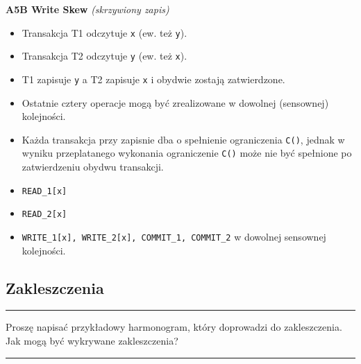 \documentclass[a5paper,6pt]{article}
\newcommand{\horrule}[1]{\rule{\linewidth}{#1}}
\begin{document}
    \textbf{A5B Write Skew} \textit{(skrzywiony zapis)}
    \begin{itemize}
        \item Transakcja T1 odczytuje \texttt{x} (ew. też \texttt{y}).
        \item Transakcja T2 odczytuje \texttt{y} (ew. też \texttt{x}).
        \item T1 zapisuje \texttt{y} a T2 zapisuje \texttt{x} i obydwie
              zostają zatwierdzone.
        \item Ostatnie cztery operacje mogą być zrealizowane w dowolnej
              (sensownej) kolejności.
        \item Każda transakcja przy zapisnie dba o spełnienie ograniczenia
              \texttt{C()}, jednak w wyniku przeplatanego wykonania ograniczenie
              \texttt{C()} może nie być spełnione po zatwierdzeniu obydwu
              transakcji.
        \item \texttt{READ\_1[x]}
        \item \texttt{READ\_2[x]}
        \item \texttt{WRITE\_1[x], WRITE\_2[x], COMMIT\_1, COMMIT\_2}
              w dowolnej sensownej kolejności.
    \end{itemize}


    \subsection{Zakleszczenia} %
    \label{sub:zakleszczenia}

    \horrule{0.5pt}
    Proszę napisać przykładowy harmonogram, który doprowadzi do zakleszczenia.
    Jak mogą być wykrywane zakleszczenia?\\
    \horrule{0.5pt}
\end{document}
